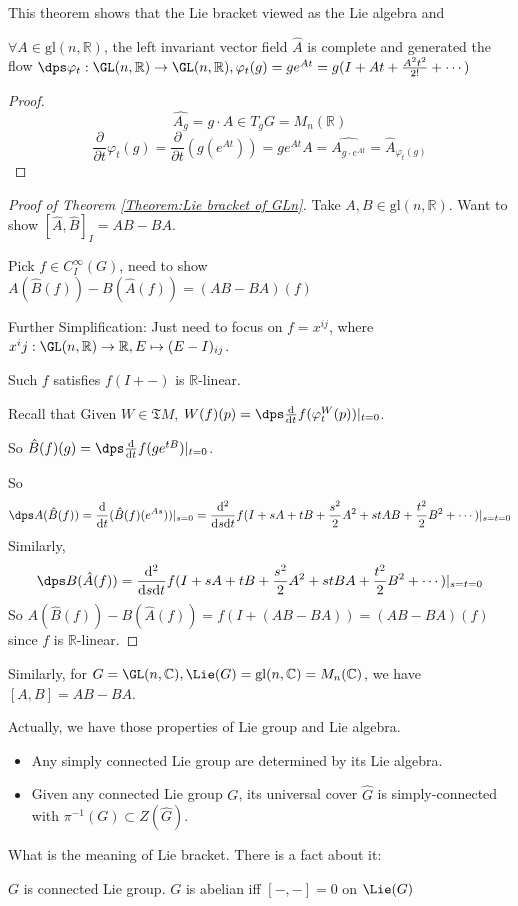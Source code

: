 \begin{remark}
    This theorem shows that the Lie bracket viewed as the Lie algebra and 
\end{remark}
\begin{lemma}
     $ \forall A\in \mathrm{gl}(n,\mathbb{R}) $, the left invariant vector field  $ \hat{A} $ is complete and generated the flow  $ \dps\varphi_t:\GL(n,\mathbb{R})\rightarrow \GL(n,\mathbb{R}), \varphi_t(g)=ge^{At}=g(I+At+\frac{A^2t^2}{2!}+\cdots) $   
\end{lemma}
\begin{proof}
     \[\hat{A_g}=g\cdot A\in T_gG=M_n(\mathbb{R})\]
      \[\frac{\partial}{\partial t}\varphi_t(g)=\frac{\partial}{\partial t}(g(e^{At}))=ge^{At}A=\hat{A_{g\cdot e^{At}}}=\hat{A}_{\varphi_t(g)}\]
\end{proof}
\begin{proof}[Proof of Theorem \ref{Theorem:Lie bracket of GLn}]
    Take  $ A,B\in \mathrm{gl}(n,\mathbb{R}) $. Want to show  $ [\hat{A},\hat{B}]_I=AB-BA $.
    
    Pick  $ f\in C^\infty_I(G) $, need to show  $ A(\hat{B}(f))-B(\hat{A}(f))=(AB-BA)(f) $
    
    Further Simplification: Just need to focus on  $ f=x^{ij} $, where  $ x^ij:\GL(n,\mathbb{R})\rightarrow \mathbb{R}, E\mapsto (E-I)_{ij} $.
    
    Such  $ f $ satisfies  $ f(I+-) $ is  $ \mathbb{R} $-linear.
    
    Recall that Given  $ W\in \mathfrak{T}M $,  $ W(f)(p)=\dps\frac{\mathrm{d}}{\mathrm{d}t}f(\varphi_t^W(p))|_{t=0} $.
    
    So  $ \hat{B}(f)(g)=\dps\frac{\mathrm{d}}{\mathrm{d}t}f(ge^{tB})|_{t=0} $.
    
    So  \[\dps A(\hat{B}(f)) =\frac{\mathrm{d}}{\mathrm{d}t}(\hat{B}(f)(e^{As}))|_{s=0}=\frac{\mathrm{d}^2}{\mathrm{d}s\mathrm{d}t}f(I+sA+tB+\frac{s^2}{2}A^2+stAB+\frac{t^2}{2}B^2+\cdots)|_{s=t=0}\]
    Similarly,
    \[\dps B(\hat{A}(f))=\frac{\mathrm{d}^2}{\mathrm{d}s\mathrm{d}t}f(I+sA+tB+\frac{s^2}{2}A^2+stBA+\frac{t^2}{2}B^2+\cdots)|_{s=t=0}\]
    So $ A(\hat{B}(f))-B(\hat{A}(f))=f(I+(AB-BA))=(AB-BA)(f) $ since  $ f $ is  $ \mathbb{R} $-linear.  
\end{proof}
Similarly, for  $ G=\GL(n,\mathbb{C}), \Lie(G)=\mathrm{gl}(n,\mathbb{C})=M_n(\mathbb{C}) $, we have  $ [A,B]=AB-BA $.
  
Actually, we have those properties of Lie group and Lie algebra.
\begin{itemize}
    \item Any simply connected Lie group are determined by its Lie algebra.
    \item Given any connected Lie group  $ G $, its universal cover  $ \hat{G} $  is simply-connected with  $ \pi^{-1}(G)\subset Z(\hat{G}) $. 
\end{itemize}
What is the meaning of Lie bracket. There is a fact about it:
\begin{fact}
     $ G $ is connected Lie group.  $ G $ is abelian iff  $ [-,-]=0 $ on  $ \Lie(G) $    
\end{fact}

